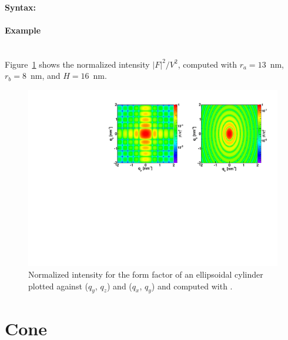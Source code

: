 \paragraph{Syntax:} 

\newpage


\paragraph{Example}\mbox{}\\
Figure~\ref{fig:FFellipscylinderEx} shows the normalized intensity
$|F|^2/V^2$, computed with $r_a=13$~nm, $r_b=8$~nm, and $H=16$~nm.
\begin{figure}[ht]
\begin{center}
\includegraphics[angle=-90,width=\textwidth]{Figures/ff/figffellipscylinder.pdf}
\end{center}
\caption{Normalized intensity for the form factor of an ellipsoidal
  cylinder plotted against ($q_y$, $q_z$) and ($q_x$,
  $q_y$) and computed with .}
\label{fig:FFellipscylinderEx}
\end{figure}


\newpage
\section{Cone}  

